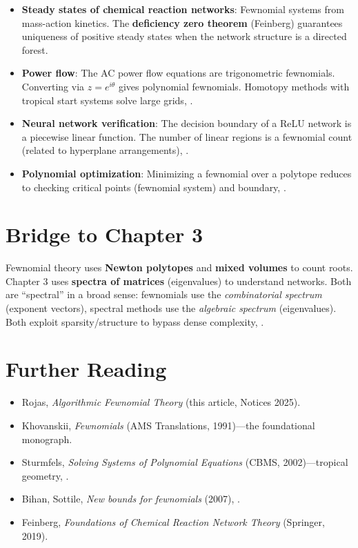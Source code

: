 \begin{itemize}
    \item \textbf{Steady states of chemical reaction networks}: Fewnomial systems from mass-action kinetics. The \textbf{deficiency zero theorem} (Feinberg) guarantees uniqueness of positive steady states when the network structure is a directed forest.
    \item \textbf{Power flow}: The AC power flow equations are trigonometric fewnomials. Converting via $z = e^{i\theta}$ gives polynomial fewnomials. Homotopy methods with tropical start systems solve large grids, \cite{rojas2025fewnomial}.
    \item \textbf{Neural network verification}: The decision boundary of a ReLU network is a piecewise linear function. The number of linear regions is a fewnomial count (related to hyperplane arrangements), \cite{rojas2025fewnomial}.
    \item \textbf{Polynomial optimization}: Minimizing a fewnomial over a polytope reduces to checking critical points (fewnomial system) and boundary, \cite{rojas2025fewnomial}.
\end{itemize}

\section{Bridge to Chapter 3}
\label{sec:few:bridge}

Fewnomial theory uses \textbf{Newton polytopes} and \textbf{mixed volumes} to count roots. Chapter 3 uses \textbf{spectra of matrices} (eigenvalues) to understand networks. Both are ``spectral'' in a broad sense: fewnomials use the \emph{combinatorial spectrum} (exponent vectors), spectral methods use the \emph{algebraic spectrum} (eigenvalues). Both exploit sparsity/structure to bypass dense complexity, \cite{rojas2025fewnomial}.

\section{Further Reading}
\label{sec:few:refs}

\begin{itemize}
    \item Rojas, \textit{Algorithmic Fewnomial Theory} (this article, Notices 2025).
    \item Khovanskii, \textit{Fewnomials} (AMS Translations, 1991)---the foundational monograph.
    \item Sturmfels, \textit{Solving Systems of Polynomial Equations} (CBMS, 2002)---tropical geometry, \cite{rojas2025fewnomial}.
    \item Bihan, Sottile, \textit{New bounds for fewnomials} (2007), \cite{rojas2025fewnomial}.
    \item Feinberg, \textit{Foundations of Chemical Reaction Network Theory} (Springer, 2019).
\end{itemize}

